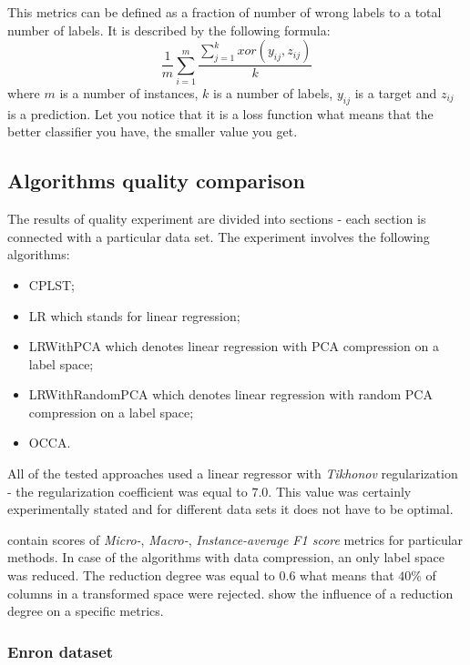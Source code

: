 This metrics can be defined as a fraction of number of wrong labels to a total number of labels. It is described by the following formula:
\begin{equation}
\label{eq:exp1}
    \frac{1}{m}\sum\limits_{i=1}^{m}\frac{\sum\limits_{j=1}^{k}xor(y_{ij}, z_{ij})}{k}
\end{equation}
where $m$ is a number of instances, $k$ is a number of labels, $y_{ij}$ is a target and $z_{ij}$ is a prediction. Let you notice that it is a loss function what means that the better classifier you have, the smaller value you get.  

\subsection{Algorithms quality comparison}

The results of quality experiment are divided into sections - each section is connected with a particular data set. The experiment involves the following algorithms:
\begin{itemize}
    \item CPLST;
    \item LR which stands for linear regression;
    \item LRWithPCA which denotes linear regression with PCA compression on a label space;
    \item LRWithRandomPCA which denotes linear regression with random PCA compression on a label space;
    \item OCCA.
\end{itemize}
All of the tested approaches used a linear regressor with \textit{Tikhonov} regularization - the regularization coefficient was equal to $7.0$. This value was certainly experimentally stated and for different data sets it does not have to be optimal.  

 contain scores of \textit{Micro-}, \textit{Macro-}, \textit{Instance-average F1 score} metrics for particular methods. In case of the algorithms with data compression, an only label space was reduced. The reduction degree was equal to $0.6$ what means that $40\%$ of columns in a transformed space were rejected.
 show the influence of a reduction degree on a specific metrics. 

\newpage
\subsubsection{Enron dataset}

